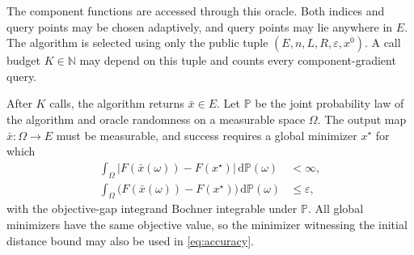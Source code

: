 \documentclass[10pt]{article}
\theoremstyle{definition}
\begin{document}
The component functions are accessed through this oracle. Both indices and query points may be chosen adaptively, and query points may lie anywhere in $E$. The algorithm is selected using only the public tuple $(E,n,L,R,\varepsilon,x^0)$. A call budget $K\in\mathbb{N}$ may depend on this tuple and counts every component-gradient query.

After $K$ calls, the algorithm returns $\bar{x}\in E$. Let $\mathbb{P}$ be the joint probability law of the algorithm and oracle randomness on a measurable space $\Omega$. The output map $\bar{x}:\Omega\to E$ must be measurable, and success requires a global minimizer $x^\star$ for which
\begin{equation}
\label{eq:accuracy}
\begin{aligned}
\int_\Omega \bigl|F(\bar{x}(\omega))-F(x^\star)\bigr|\,\mathrm{d}\mathbb{P}(\omega) &<\infty,\\
\int_\Omega \bigl(F(\bar{x}(\omega))-F(x^\star)\bigr)\,\mathrm{d}\mathbb{P}(\omega) &\leq\varepsilon,
\end{aligned}
\end{equation}
with the objective-gap integrand Bochner integrable under $\mathbb{P}$. All global minimizers have the same objective value, so the minimizer witnessing the initial distance bound may also be used in \eqref{eq:accuracy}.
\end{document}
